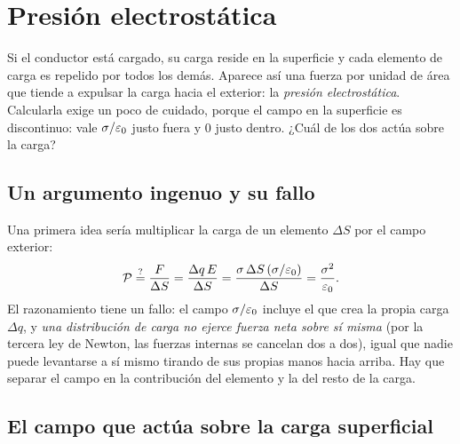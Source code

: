 \section{Presión electrostática}\label{sec:presion}
Si el conductor está cargado, su carga reside en la superficie y cada elemento de carga es repelido por todos los demás. Aparece así una
fuerza por unidad de área que tiende a expulsar la carga hacia el exterior: la \emph{presión electrostática}. Calcularla exige un poco de
cuidado, porque el campo en la superficie es discontinuo: vale $\sigma/\varepsilon_{0}$ justo fuera y $0$ justo dentro. ¿Cuál de los dos actúa sobre la carga?

\subsection{Un argumento ingenuo y su fallo}\label{sec:presion-ingenuo}
Una primera idea sería multiplicar la carga de un elemento $\Delta S$ por el campo exterior:
\[
  \mathcal{P}\overset{?}{=}\frac{F}{\Delta S}=\frac{\Delta q\,E}{\Delta S}=\frac{\sigma\,\Delta S\,(\sigma/\varepsilon_{0})}{\Delta S}=\frac{\sigma^{2}}{\varepsilon_{0}}.
\]
El razonamiento tiene un fallo: el campo $\sigma/\varepsilon_{0}$ incluye el que crea la propia carga $\Delta q$, y \emph{una distribución de carga no ejerce
fuerza neta sobre sí misma} (por la tercera ley de Newton, las fuerzas internas se cancelan dos a dos), igual que nadie puede levantarse a sí
mismo tirando de sus propias manos hacia arriba. Hay que separar el campo en la contribución del elemento y la del resto de la carga.

\subsection{El campo que actúa sobre la carga superficial}\label{sec:presion-campo}


